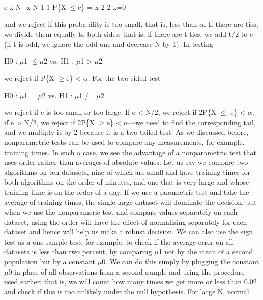 e x N$-$x N 1 1 P\{X $\leq$e\} = x 2 2 x=0

and we reject if this probability is too small, that is, less than $\alpha$. If there are ties, we divide them equally to both sides; that is, if there are t ties, we add t/2 to e (if t is odd, we ignore the odd one and decrease N by 1). In testing

H0 : $\mu$1 $\leq$$\mu$2 vs. H1 : $\mu$1 > $\mu$2

we reject if P\{X $\geq$e\} < $\alpha$. For the two-sided test

H0 : $\mu$1 = $\mu$2 vs. H1 : $\mu$1 /= $\mu$2

we reject if e is too small or too large. If e < N/2, we reject if 2P\{X $\leq$ e\} < $\alpha$; if e > N/2, we reject if 2P\{X $\geq$e\} < $\alpha$---we need to find the corresponding tail, and we multiply it by 2 because it is a two-tailed test. As we discussed before, nonparametric tests can be used to compare any measurements, for example, training times. In such a case, we see the advantage of a nonparametric test that uses order rather than averages of absolute values. Let us say we compare two algorithms on ten datasets, nine of which are small and have training times for both algorithms on the order of minutes, and one that is very large and whose training time is on the order of a day. If we use a parametric test and take the average of training times, the single large dataset will dominate the decision, but when we use the nonparameric test and compare values separately on each dataset, using the order will have the effect of normalizing separately for each dataset and hence will help us make a robust decision. We can also use the sign test as a one sample test, for example, to check if the average error on all datasets is less than two percent, by comparing $\mu$1 not by the mean of a second population but by a constant $\mu$0. We can do this simply by plugging the constant $\mu$0 in place of all observations from a second sample and using the procedure used earlier; that is, we will count how many times we get more or less than 0.02 and check if this is too unlikely under the null hypothesis. For large N, normal

